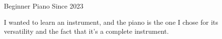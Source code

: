 \begin{cventries}

\cventry
{Beginner} %
{Piano} %
{} %
{Since 2023} %
{ %
\begin{cvitems}
\item {I wanted to learn an instrument, and the piano is the one I chose for its versatility and the fact that it's a complete instrument.}
\end{cvitems}
}



\end{cventries}
